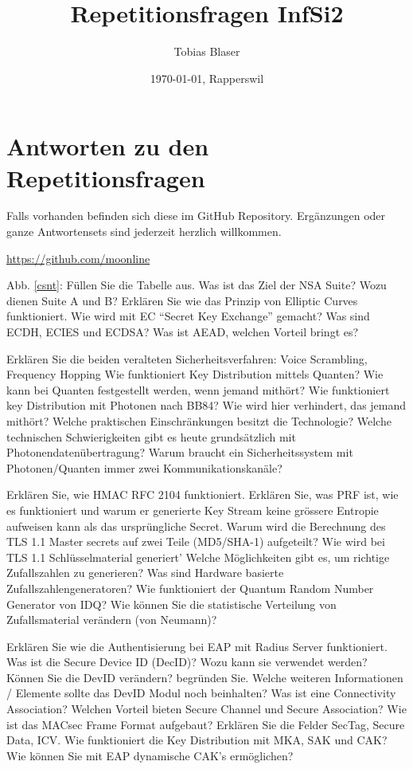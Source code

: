\documentclass[ngerman,a4paper,12pt]{scrreprt}
\title{Repetitionsfragen InfSi2}
\author{Tobias Blaser}
\date{\today{}, Rapperswil}
\begin{document}
\tableofcontents

\vspace{1cm}
\section*{Antworten zu den Repetitionsfragen}
Falls vorhanden befinden sich diese im GitHub Repository. Ergänzungen oder ganze Antwortensets sind jederzeit herzlich willkommen.

\noindent\url{https://github.com/moonline}

\clearpage

\ol
	\li Abb. \ref{csnt}: Füllen Sie die Tabelle aus.
	\li Was ist das Ziel der NSA Suite? Wozu dienen Suite A und B?
	\li Erklären Sie wie das Prinzip von Elliptic Curves funktioniert.
	\li Wie wird mit EC ``Secret Key Exchange'' gemacht?
	\li Was sind ECDH, ECIES und ECDSA?
	\li Was ist AEAD, welchen Vorteil bringt es?
\olS


\olR
	\li Erklären Sie die beiden veralteten Sicherheitsverfahren: Voice Scrambling, Frequency Hopping
	\li Wie funktioniert Key Distribution mittels Quanten?
	\li Wie kann bei Quanten festgestellt werden, wenn jemand mithört?
	\li Wie funktioniert key Distribution mit Photonen nach BB84? Wie wird hier verhindert, das jemand mithört? Welche praktischen Einschränkungen besitzt die Technologie?
	\li Welche technischen Schwierigkeiten gibt es heute grundsätzlich mit Photonendatenübertragung?
	\li Warum braucht ein Sicherheitssystem mit Photonen/Quanten immer zwei Kommunikationskanäle?
\olS


\olR
	\li Erklären Sie, wie HMAC RFC 2104 funktioniert.
	\li Erklären Sie, was PRF ist, wie es funktioniert und warum er generierte Key Stream keine grössere Entropie aufweisen kann als das ursprüngliche Secret.
	\li Warum wird die Berechnung des TLS 1.1 Master secrets auf zwei Teile (MD5/SHA-1) aufgeteilt? Wie wird bei TLS 1.1 Schlüsselmaterial generiert'
	\li Welche Möglichkeiten gibt es, um richtige Zufallszahlen zu generieren?
	\li Was sind Hardware basierte Zufallszahlengeneratoren?
	\li Wie funktioniert der Quantum Random Number Generator von IDQ?
	\li Wie können Sie die statistische Verteilung von Zufallsmaterial verändern (von Neumann)?
\olS


\olR
	\li Erklären Sie wie die Authentisierung bei EAP mit Radius Server funktioniert.
	\li Was ist die Secure Device ID (DecID)? Wozu kann sie verwendet werden? Können Sie die DevID verändern? begründen Sie. Welche weiteren Informationen / Elemente sollte das DevID Modul noch beinhalten?
	\li Was ist eine Connectivity Association? Welchen Vorteil bieten Secure Channel und Secure Association?
	\li Wie ist das MACsec Frame Format aufgebaut? Erklären Sie die Felder SecTag, Secure Data, ICV.
	\li Wie funktioniert die Key Distribution mit MKA, SAK und CAK?
	\li Wie können Sie mit EAP dynamische CAK's ermöglichen?
\olS
\end{document}
